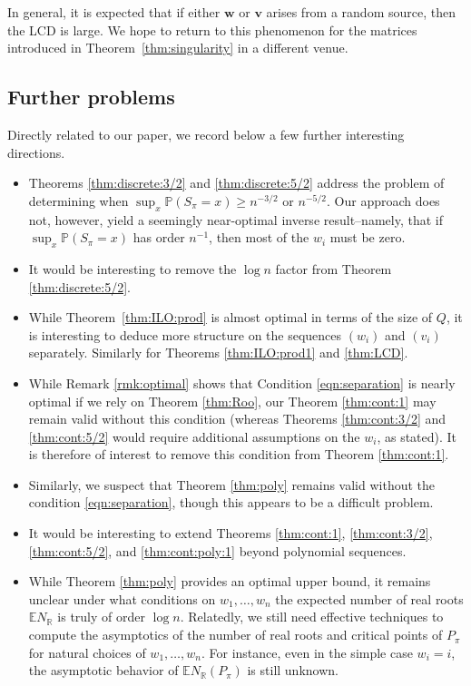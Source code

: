 \documentclass[reqno]{amsart}
\newcommand\R{{\mathbb{R}}}
\renewcommand\P{{\mathbb{P}}}
\newcommand\BMv{{\bm v}}
\newcommand\BMw{{\bm w}}
\theoremstyle{plain}
\theoremstyle{definition}
\begin{document}
In general, it is expected that if either \(\BMw\) or \(\BMv\) arises from a random source,
then the LCD is large. We hope to return to this phenomenon for the matrices introduced
in Theorem~\ref{thm:singularity} in a different venue.



\subsection{Further problems} Directly related to our paper, we record below a few further interesting directions.



\begin{itemize}
\item Theorems \ref{thm:discrete:3/2} and \ref{thm:discrete:5/2} address the problem of determining when $\sup_{x}\P(S_{\pi}=x) \ge n^{-3/2}$ or $n^{-5/2}$. Our approach does not, however, yield a seemingly near-optimal inverse result--namely, that if $\sup_{x}\P(S_{\pi}=x)$ has order $n^{-1}$, then most of the $w_{i}$ must be zero.
\vskip 0.1in
\item It would be interesting to remove the $\log n$ factor from Theorem \ref{thm:discrete:5/2}.
\vskip 0.1in
\item While Theorem~\ref{thm:ILO:prod} is almost optimal in terms of the size of $Q$, it is interesting to deduce more structure on the sequences $(w_i)$ and $(v_i)$ separately. Similarly for Theorems \ref{thm:ILO:prod1}
and \ref{thm:LCD}.
\vskip 0.1in
\item While Remark \ref{rmk:optimal} shows that Condition \ref{eqn:separation} is nearly optimal if we rely on Theorem \ref{thm:Roo}, our Theorem \ref{thm:cont:1} may remain valid without this condition (whereas Theorems \ref{thm:cont:3/2} and \ref{thm:cont:5/2} would require additional assumptions on the $w_{i}$, as stated). It is therefore of interest to remove this condition from Theorem \ref{thm:cont:1}.
\vskip 0.1in
\item Similarly, we suspect that Theorem \ref{thm:poly} remains valid without the condition \eqref{eqn:separation}, though this appears to be a difficult problem.
\vskip 0.1in
\item It would be interesting to extend Theorems \ref{thm:cont:1}, \ref{thm:cont:3/2}, \ref{thm:cont:5/2}, and \ref{thm:cont:poly:1} beyond polynomial sequences.
\vskip 0.1in
\item While Theorem \ref{thm:poly} provides an optimal upper bound, it remains unclear under what conditions on $w_{1}, \dots, w_{n}$ the expected number of real roots $\mathbb{E}N_{\R}$ is truly of order $\log n$. 
Relatedly, we still need effective techniques to compute the asymptotics of the number of real roots and critical points of $P_{\pi}$ for natural choices of $w_1,\dots,w_n$. 
For instance, even in the simple case $w_i=i$, the asymptotic behavior of $\mathbb{E}N_{\R}(P_{\pi})$ is still unknown.
\end{itemize}
\end{document}

